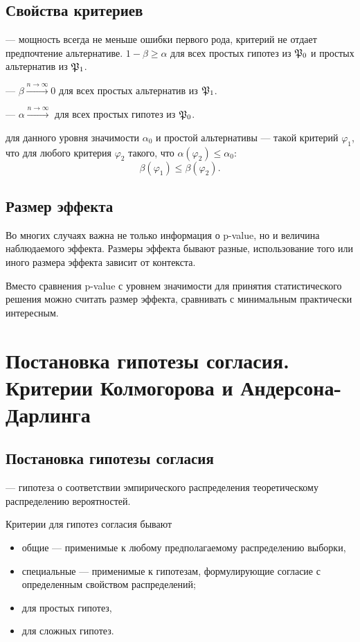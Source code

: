 \documentclass[11pt]{book}
\begin{document}
\subsection{Свойства критериев}
\begin{definition}[]
	 --- мощность всегда не меньше ошибки первого рода, критерий не отдает предпочтение альтернативе. $1 - \beta \ge \alpha$ для всех простых гипотез из $\mathfrak{P}_0$ и простых альтернатив из $\mathfrak{P}_1$.
\end{definition}
\begin{definition}[]
	 --- $\beta \xrightarrow{n \to \infty} 0$ для всех простых альтернатив из $\mathfrak{P}_1$.
\end{definition}
\begin{definition}[]
	 --- $\alpha \xrightarrow{n \to \infty}$ для всех простых гипотез из $\mathfrak{P}_0$.
\end{definition}
\begin{definition}[]
	 для данного уровня значимости $\alpha_0$ и простой альтернативы --- такой критерий $\varphi_1$, что для любого критерия $\varphi_2$ такого, что $\alpha(\varphi_2) \le \alpha_0$:
	\[
	\beta(\varphi_1) \le \beta(\varphi_2)
	.\] 
\end{definition}
\subsection{Размер эффекта}
Во многих случаях важна не только информация о p-value, но и величина наблюдаемого эффекта. Размеры эффекта бывают разные, использование того или иного размера эффекта зависит от контекста.

Вместо сравнения p-value с уровнем значимости для принятия статистического решения можно считать размер эффекта, сравнивать с минимальным практически интересным.

\section{Постановка гипотезы согласия. Критерии Колмогорова и Андерсона-Дарлинга}
\subsection{Постановка гипотезы согласия}
\begin{definition}[]
	 --- гипотеза о соответствии эмпирического распределения теоретическому распределению вероятностей. 
\end{definition}
Критерии для гипотез согласия бывают
\begin{itemize}
	\item общие --- применимые к любому предполагаемому распределению выборки,
	\item специальные --- применимые к гипотезам, формулирующие согласие с определенным свойством распределений;
\end{itemize}
\begin{itemize}
	\item для простых гипотез,
	\item для сложных гипотез.
\end{itemize}
\end{document}
